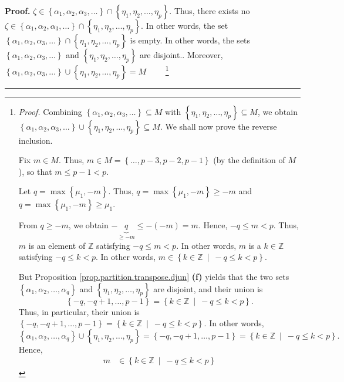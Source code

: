 \documentclass[numbers=enddot,12pt,final,onecolumn,notitlepage]{scrartcl}%
\theoremstyle{definition}
\newenvironment{proof}[1][Proof]{\noindent\textbf{#1.} }{\ \rule{0.5em}{0.5em}}
\newenvironment{verlong}{}{}
\begin{document}
\begin{verlong}
\begin{proof}
{$\zeta\in\left\{  \alpha_{1},\alpha_{2},\alpha_{3},\ldots\right\}
\cap\left\{  \eta_{1},\eta_{2},\ldots,\eta_{p}\right\}  $. Thus, there exists
no $\zeta\in\left\{  \alpha_{1},\alpha_{2},\alpha_{3},\ldots\right\}
\cap\left\{  \eta_{1},\eta_{2},\ldots,\eta_{p}\right\}  $. In other words, the
set $\left\{  \alpha_{1},\alpha_{2},\alpha_{3},\ldots\right\}  \cap\left\{
\eta_{1},\eta_{2},\ldots,\eta_{p}\right\}  $ is empty. In other words, the
sets $\left\{  \alpha_{1},\alpha_{2},\alpha_{3},\ldots\right\}  $ and
$\left\{  \eta_{1},\eta_{2},\ldots,\eta_{p}\right\}  $ are disjoint.}.
Moreover, $\left\{  \alpha_{1},\alpha_{2},\alpha_{3},\ldots\right\}
\cup\left\{  \eta_{1},\eta_{2},\ldots,\eta_{p}\right\}  =M$%
\ \ \ \ \footnote{\textit{Proof.} Combining $\left\{  \alpha_{1},\alpha
_{2},\alpha_{3},\ldots\right\}  \subseteq M$ with $\left\{  \eta_{1},\eta
_{2},\ldots,\eta_{p}\right\}  \subseteq M$, we obtain $\left\{  \alpha
_{1},\alpha_{2},\alpha_{3},\ldots\right\}  \cup\left\{  \eta_{1},\eta
_{2},\ldots,\eta_{p}\right\}  \subseteq M$. We shall now prove the reverse
inclusion.
\par
Fix $m\in M$. Thus, $m\in M=\left\{  \ldots,p-3,p-2,p-1\right\}  $ (by the
definition of $M$), so that $m\leq p-1<p$.
\par
Let $q=\max\left\{  \mu_{1},-m\right\}  $. Thus, $q=\max\left\{  \mu
_{1},-m\right\}  \geq-m$ and $q=\max\left\{  \mu_{1},-m\right\}  \geq\mu_{1}$.
\par
From $q\geq-m$, we obtain $-\underbrace{q}_{\geq-m}\leq-\left(  -m\right)
=m$. Hence, $-q\leq m<p$. Thus, $m$ is an element of $\mathbb{Z}$ satisfying
$-q\leq m<p$. In other words, $m$ is a $k\in\mathbb{Z}$ satisfying $-q\leq
k<p$. In other words, $m\in\left\{  k\in\mathbb{Z}\ \mid\ -q\leq k<p\right\}
$.
\par
But Proposition \ref{prop.partition.transpose.djun} \textbf{(f)} yields that
the two sets $\left\{  \alpha_{1},\alpha_{2},\ldots,\alpha_{q}\right\}  $ and
$\left\{  \eta_{1},\eta_{2},\ldots,\eta_{p}\right\}  $ are disjoint, and their
union is
\[
\left\{  -q,-q+1,\ldots,p-1\right\}  =\left\{  k\in\mathbb{Z}\ \mid\ -q\leq
k<p\right\}  .
\]
Thus, in particular, their union is $\left\{  -q,-q+1,\ldots,p-1\right\}
=\left\{  k\in\mathbb{Z}\ \mid\ -q\leq k<p\right\}  $. In other words,%
\[
\left\{  \alpha_{1},\alpha_{2},\ldots,\alpha_{q}\right\}  \cup\left\{
\eta_{1},\eta_{2},\ldots,\eta_{p}\right\}  =\left\{  -q,-q+1,\ldots
,p-1\right\}  =\left\{  k\in\mathbb{Z}\ \mid\ -q\leq k<p\right\}  .
\]
Hence,%
\begin{align*}
m  &  \in\left\{  k\in\mathbb{Z}\ \mid\ -q\leq k<p\right\}

\end{align*}}
\end{proof}
\end{verlong}
\end{document}
